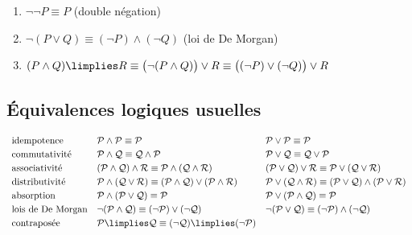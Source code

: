 \documentclass[11pt,class=report,crop=false]{standalone}
\begin{document}
\begin{exemple}
	\sauteligne
	\begin{enumerate}
		\item $\lnot \lnot P \equiv P$ (double négation)
		\item $\lnot (P \lor Q) \equiv (\lnot P) \land (\lnot Q)$ (loi de De Morgan)
		\item $(P \land Q) \limplies R \equiv \big( \lnot (P \land Q)\big) \lor R \equiv \big( (\lnot P) \lor (\lnot Q) \big) \lor R$
	\end{enumerate}
\end{exemple}


\subsection{Équivalences logiques usuelles}


\[
\begin{array}{l l l}
	\text{idempotence} 
	& \mathcal{P}\land\mathcal{P} \equiv \mathcal{P}
	& \mathcal{P}\lor\mathcal{P} \equiv \mathcal{P}
	\\[0.6ex]
	
	\text{commutativité}
	& \mathcal{P}\land\mathcal{Q} \equiv \mathcal{Q}\land\mathcal{P}
	& \mathcal{P}\lor\mathcal{Q} \equiv \mathcal{Q}\lor\mathcal{P}
	\\[0.6ex]
	
	\text{associativité}
	& (\mathcal{P}\land\mathcal{Q})\land\mathcal{R} \equiv \mathcal{P}\land(\mathcal{Q}\land\mathcal{R})
	& (\mathcal{P}\lor\mathcal{Q})\lor\mathcal{R} \equiv \mathcal{P}\lor(\mathcal{Q}\lor\mathcal{R})
	\\[0.6ex]
	
	\text{distributivité}
	& \mathcal{P}\land(\mathcal{Q}\lor\mathcal{R}) \equiv (\mathcal{P}\land\mathcal{Q}) \lor (\mathcal{P}\land\mathcal{R})
	& \mathcal{P}\lor(\mathcal{Q}\land\mathcal{R}) \equiv (\mathcal{P}\lor\mathcal{Q}) \land (\mathcal{P}\lor\mathcal{R})
	\\[0.6ex]
	
	\text{absorption}
	& \mathcal{P}\land(\mathcal{P}\lor\mathcal{Q}) \equiv \mathcal{P}
	& \mathcal{P}\lor(\mathcal{P}\land\mathcal{Q}) \equiv \mathcal{P}
	\\[0.6ex]
	
	\text{lois de De Morgan}\index{lois de De Morgan}
	& \lnot(\mathcal{P}\land\mathcal{Q}) \equiv (\lnot\mathcal{P})\lor(\lnot\mathcal{Q})
	& \lnot(\mathcal{P}\lor\mathcal{Q}) \equiv (\lnot\mathcal{P})\land(\lnot\mathcal{Q})
	\\[0.6ex]
	
	\text{contraposée}\index{contraposition}
	& \mathcal{P}\limplies\mathcal{Q} \equiv (\lnot\mathcal{Q})\limplies(\lnot\mathcal{P})
	& \\
\end{array}
\]
\end{document}
